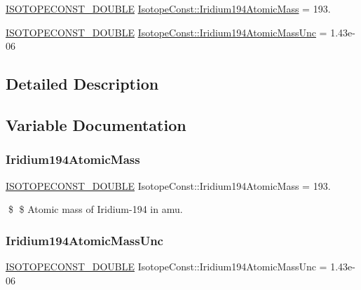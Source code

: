 \begin{DoxyCompactItemize}
\item 
\mbox{\hyperlink{group___isotope_const-_macros_ga8f45a7272ce02c0b4c65c44636ed719a}{I\+S\+O\+T\+O\+P\+E\+C\+O\+N\+S\+T\+\_\+\+D\+O\+U\+B\+LE}} \mbox{\hyperlink{group___isotope_const-_iridium-_ir194_ga148ec6bc3b0d86d763a1df9f53d200bd}{Isotope\+Const\+::\+Iridium194\+Atomic\+Mass}} = 193.
\item 
\mbox{\hyperlink{group___isotope_const-_macros_ga8f45a7272ce02c0b4c65c44636ed719a}{I\+S\+O\+T\+O\+P\+E\+C\+O\+N\+S\+T\+\_\+\+D\+O\+U\+B\+LE}} \mbox{\hyperlink{group___isotope_const-_iridium-_ir194_ga69a0b5d6193853f75013c26b484f50e6}{Isotope\+Const\+::\+Iridium194\+Atomic\+Mass\+Unc}} = 1.\+43e-\/06
\end{DoxyCompactItemize}


\subsection{Detailed Description}


\subsection{Variable Documentation}
\mbox{\label{group___isotope_const-_iridium-_ir194_ga148ec6bc3b0d86d763a1df9f53d200bd}} 
\subsubsection{\texorpdfstring{Iridium194\+Atomic\+Mass}{Iridium194AtomicMass}}
{\footnotesize\ttfamily \mbox{\hyperlink{group___isotope_const-_macros_ga8f45a7272ce02c0b4c65c44636ed719a}{I\+S\+O\+T\+O\+P\+E\+C\+O\+N\+S\+T\+\_\+\+D\+O\+U\+B\+LE}} Isotope\+Const\+::\+Iridium194\+Atomic\+Mass = 193.}

\$ \$ Atomic mass of Iridium-\/194 in amu. \mbox{\label{group___isotope_const-_iridium-_ir194_ga69a0b5d6193853f75013c26b484f50e6}} 
\subsubsection{\texorpdfstring{Iridium194\+Atomic\+Mass\+Unc}{Iridium194AtomicMassUnc}}
{\footnotesize\ttfamily \mbox{\hyperlink{group___isotope_const-_macros_ga8f45a7272ce02c0b4c65c44636ed719a}{I\+S\+O\+T\+O\+P\+E\+C\+O\+N\+S\+T\+\_\+\+D\+O\+U\+B\+LE}} Isotope\+Const\+::\+Iridium194\+Atomic\+Mass\+Unc = 1.\+43e-\/06}

